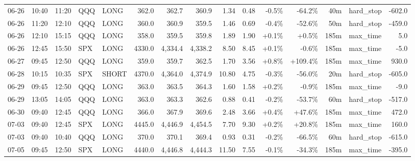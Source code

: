 \documentclass[11pt,a4paper,twoside]{article}
\begin{document}
\begin{landscape}
\begin{center}
\begin{longtable}{>{\color{txtmain}}l l l l l r r r r r r r r >{\color{txtmain}}l r}
06-26 & 10:40 & 11:20 & QQQ & LONG & 362.0 & 362.7 & 360.9 & 1.34 & 0.48 & \textcolor{lossred}{-0.5\%} & \textcolor{lossred}{-64.2\%} & 40m & hard\_stop & \textcolor{lossred}{-602.0} \\
06-26 & 11:20 & 12:10 & QQQ & LONG & 360.0 & 360.9 & 359.5 & 1.46 & 0.69 & \textcolor{lossred}{-0.4\%} & \textcolor{lossred}{-52.6\%} & 50m & hard\_stop & \textcolor{lossred}{-459.0} \\
06-26 & 12:10 & 15:15 & QQQ & LONG & 358.0 & 359.5 & 359.8 & 1.89 & 1.90 & \textcolor{wingreen}{+0.1\%} & \textcolor{wingreen}{+0.5\%} & 185m & max\_time & \textcolor{wingreen}{5.0} \\
06-26 & 12:45 & 15:50 & SPX & LONG & 4330.0 & 4,334.4 & 4,338.2 & 8.50 & 8.45 & \textcolor{wingreen}{+0.1\%} & \textcolor{lossred}{-0.6\%} & 185m & max\_time & \textcolor{lossred}{-5.0} \\
06-27 & 09:45 & 12:50 & QQQ & LONG & 359.0 & 359.7 & 362.5 & 1.70 & 3.56 & \textcolor{wingreen}{+0.8\%} & \textcolor{wingreen}{+109.4\%} & 185m & max\_time & \textcolor{wingreen}{930.0} \\
06-28 & 10:15 & 10:35 & SPX & SHORT & 4370.0 & 4,364.0 & 4,374.9 & 10.80 & 4.75 & \textcolor{lossred}{-0.3\%} & \textcolor{lossred}{-56.0\%} & 20m & hard\_stop & \textcolor{lossred}{-605.0} \\
06-29 & 09:45 & 12:50 & QQQ & LONG & 363.0 & 363.5 & 364.3 & 1.60 & 1.58 & \textcolor{wingreen}{+0.2\%} & \textcolor{lossred}{-0.9\%} & 185m & max\_time & \textcolor{lossred}{-9.0} \\
06-29 & 13:05 & 14:05 & QQQ & LONG & 363.0 & 363.3 & 362.6 & 0.88 & 0.41 & \textcolor{lossred}{-0.2\%} & \textcolor{lossred}{-53.7\%} & 60m & hard\_stop & \textcolor{lossred}{-517.0} \\
06-30 & 09:40 & 12:45 & QQQ & LONG & 366.0 & 367.9 & 369.6 & 2.48 & 3.66 & \textcolor{wingreen}{+0.4\%} & \textcolor{wingreen}{+47.6\%} & 185m & max\_time & \textcolor{wingreen}{472.0} \\
07-03 & 09:40 & 12:45 & SPX & LONG & 4445.0 & 4,446.9 & 4,454.5 & 7.70 & 9.30 & \textcolor{wingreen}{+0.2\%} & \textcolor{wingreen}{+20.8\%} & 185m & max\_time & \textcolor{wingreen}{160.0} \\
07-03 & 09:40 & 10:40 & QQQ & LONG & 370.0 & 370.1 & 369.4 & 0.93 & 0.31 & \textcolor{lossred}{-0.2\%} & \textcolor{lossred}{-66.5\%} & 60m & hard\_stop & \textcolor{lossred}{-615.0} \\
07-05 & 09:45 & 12:50 & SPX & LONG & 4440.0 & 4,446.8 & 4,444.3 & 11.50 & 7.55 & \textcolor{lossred}{-0.1\%} & \textcolor{lossred}{-34.3\%} & 185m & max\_time & \textcolor{lossred}{-395.0} \\

\end{longtable}
\end{center}
\end{landscape}
\end{document}
